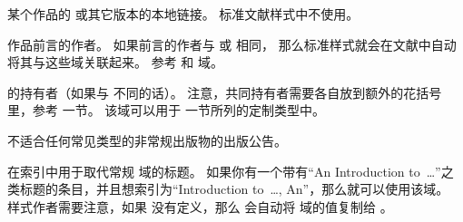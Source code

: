 \begin{fieldlist}

某个作品的  或其它版本的本地链接。
标准文献样式中不使用。




作品前言的作者。
如果前言的作者与  或  相同，
那么标准样式就会在文献中自动将其与这些域关联起来。
参考  和  域。




 的持有者（如果与  不同的话）。
注意，共同持有者需要各自放到额外的花括号里，参考  一节。
该域可以用于  一节所列的定制类型中。




不适合任何常见类型的非常规出版物的出版公告。




在索引中用于取代常规  域的标题。
如果你有一个带有“An Introduction to~\dots”之类标题的条目，并且想索引为“Introduction to~\dots, An”，那么就可以使用该域。
样式作者需要注意，如果  没有定义，那么 \biblatex 会自动将  域的值复制给 。


\end{fieldlist}
